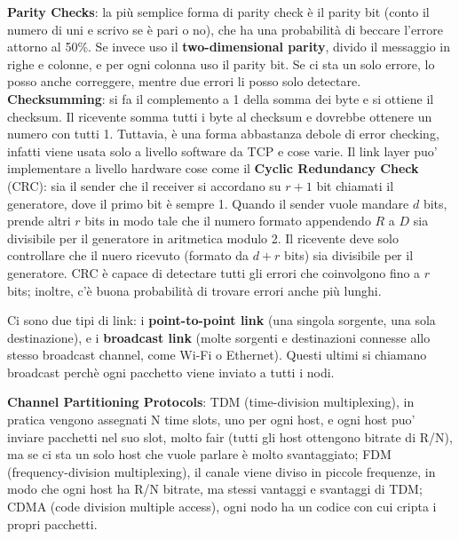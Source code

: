 \documentclass[a4paper,10pt]{article} %
\renewcommand{\b}[1]{%
    {\textbf{#1}}}
\begin{document}
\b{Parity Checks}: la più semplice forma di parity check è il parity bit (conto il numero di uni e scrivo se è pari o no), che ha una probabilità di beccare l'errore attorno al 50\%. Se invece uso il \b{two-dimensional parity}, divido il messaggio in righe e colonne, e per ogni colonna uso il parity bit. Se ci sta un solo errore, lo posso anche correggere, mentre due errori li posso solo detectare.
\b{Checksumming}: si fa il complemento a 1 della somma dei byte e si ottiene il checksum. Il ricevente somma tutti i byte al checksum e dovrebbe ottenere un numero con tutti 1. Tuttavia, è una forma abbastanza debole di error checking, infatti viene usata solo a livello software da TCP e cose varie. Il link layer puo' implementare a livello hardware cose come il \b{Cyclic Redundancy Check} (CRC): sia il sender che il receiver si accordano su $r + 1$ bit chiamati il generatore, dove il primo bit è sempre 1. Quando il sender vuole mandare $d$ bits, prende altri $r$ bits in modo tale che il numero formato appendendo $R$ a $D$ sia divisibile per il generatore in aritmetica modulo 2. Il ricevente deve solo controllare che il nuero ricevuto (formato da $d + r$ bits) sia divisibile per il generatore. CRC è capace di detectare tutti gli errori che coinvolgono fino a $r$ bits; inoltre, c'è buona probabilità di trovare errori anche più lunghi.

Ci sono due tipi di link: i \b{point-to-point link} (una singola sorgente, una sola destinazione), e i \b{broadcast link} (molte sorgenti e destinazioni connesse allo stesso broadcast channel, come Wi-Fi o Ethernet). Questi ultimi si chiamano broadcast perchè ogni pacchetto viene inviato a tutti i nodi.

\b{Channel Partitioning Protocols}: TDM (time-division multiplexing), in pratica vengono assegnati N time slots, uno per ogni host, e ogni host puo' inviare pacchetti nel suo slot, molto fair (tutti gli host ottengono bitrate di R/N), ma se ci sta un solo host che vuole parlare è molto svantaggiato; FDM (frequency-division multiplexing), il canale viene diviso in piccole frequenze, in modo che ogni host ha R/N bitrate, ma stessi vantaggi e svantaggi di TDM; CDMA (code division multiple access), ogni nodo ha un codice con cui cripta i propri pacchetti.
\end{document}
